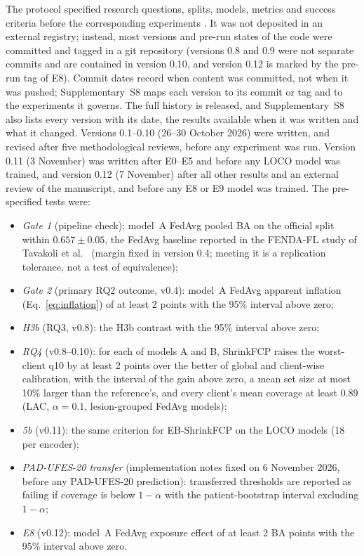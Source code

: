 The protocol specified research questions, splits, models, metrics and success criteria before the
corresponding experiments \cite{nosek2018preregistration}. It was not deposited in an external registry;
instead, most versions and pre-run states of the code were committed and tagged in a git repository (versions 0.8 and 0.9 were not separate commits and are contained in version 0.10, and version 0.12 is marked by the pre-run tag of E8). Commit dates record when content was committed, not when it was pushed; Supplementary~S8 maps each version to its commit or tag and to the experiments it governs. The full history is released, and Supplementary~S8 also lists every version with its date, the results available when it was written and what it changed. Versions 0.1--0.10
(26--30 October 2026) were written, and revised after five methodological reviews, before any experiment
was run. Version 0.11 (3 November) was written after E0--E5 and before any LOCO model was trained, and
version 0.12 (7 November) after all other results and an external review of the manuscript, and before
any E8 or E9 model was trained. The pre-specified tests were:
\begin{itemize}
  \item \emph{Gate 1} (pipeline check): model~A FedAvg pooled BA on the official split within
    $0.657\pm0.05$, the FedAvg baseline reported in the FENDA-FL study of Tavakoli et al.\
    \cite{tavakoli2024fendafl} (margin fixed in version 0.4; meeting it is a replication tolerance, not
    a test of equivalence);
  \item \emph{Gate 2} (primary RQ2 outcome, v0.4): model~A FedAvg apparent inflation
    (Eq.~\ref{eq:inflation}) of at least 2 points with the 95\% interval above zero;
  \item \emph{H3b} (RQ3, v0.8): the H3b contrast with the 95\% interval above zero;
  \item \emph{RQ4} (v0.8--0.10): for each of models A and B, ShrinkFCP raises the worst-client q10 by at
    least 2 points over the better of global and client-wise calibration, with the interval of the gain
    above zero, a mean set size at most 10\% larger than the reference's, and every client's mean coverage
    at least 0.89 (LAC, $\alpha=0.1$, lesion-grouped FedAvg models);
  \item \emph{5b} (v0.11): the same criterion for EB-ShrinkFCP on the LOCO models (18 per encoder);
  \item \emph{PAD-UFES-20 transfer} (implementation notes fixed on 6 November 2026, before any
    PAD-UFES-20 prediction): transferred thresholds are reported as failing if coverage is below
    $1-\alpha$ with the patient-bootstrap interval excluding $1-\alpha$;
  \item \emph{E8} (v0.12): model~A FedAvg exposure effect of at least 2 BA points with the 95\% interval
    above zero.
\end{itemize}
